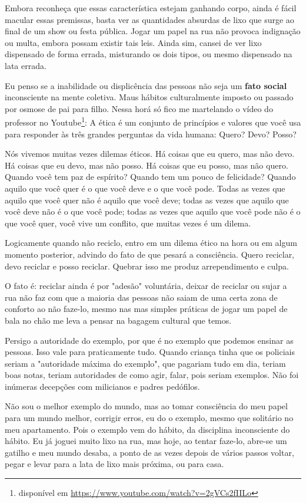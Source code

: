 Embora reconheça que essas característica estejam ganhando corpo, ainda é fácil macular essas premissas, basta ver as quantidades absurdas de lixo que surge ao final de um show ou festa pública. Jogar um papel na rua não provoca indignação ou multa, embora possam existir tais leis.
Ainda sim, cansei de ver lixo dispensado de forma errada, misturando os dois tipos, ou mesmo dispensado na lata errada.

Eu penso se a inabilidade ou displicência das pessoas não seja um \textbf{fato social} inconsciente na mente coletiva. Maus hábitos culturalmente imposto ou passado por osmose de pai para filho.
Nessa horá só fico me martelando o vídeo do professor  no Youtube\footnote{disponível em \url{https://www.youtube.com/watch?v=2gVCs2fIILo}}: A ética é um conjunto de princípios e valores que você usa para responder às três grandes perguntas da vida humana: Quero? Devo? Posso?

Nós vivemos muitas vezes dilemas éticos. Há coisas que eu quero, mas não devo. Há coisas que eu devo, mas não posso. Há coisas que eu posso, mas não quero. Quando você tem paz de espírito? Quando tem um pouco de felicidade? Quando aquilo que você quer é o que você deve e o que você pode. Todas as vezes que aquilo que você quer não é aquilo que você deve; todas as vezes que aquilo que você deve não é o que você pode; todas as vezes que aquilo que você pode não é o que você quer, você vive um conflito, que muitas vezes é um dilema.

Logicamente quando não reciclo, entro em um dilema ético na hora ou em algum momento posterior, advindo do fato de que pesará a consciência. Quero reciclar, devo reciclar e posso reciclar. Quebrar isso me produz arrependimento e culpa.

O fato é: reciclar ainda é por "adesão" voluntária, deixar de reciclar ou sujar a rua não faz com que a maioria das pessoas não saiam de uma certa zona de conforto ao não faze-lo, mesmo nas mas simples práticas de jogar um papel de bala no chão me leva a pensar na bagagem cultural que temos.

Persigo a autoridade do exemplo, por que é no exemplo que podemos ensinar as pessoas. Isso vale para praticamente tudo. Quando criança tinha que os policiais seriam a "autoridade máxima do exemplo", que pagariam tudo em dia, teriam boas notas, teriam autoridades de como agir, falar, pois seriam exemplos. Não foi inúmeras decepções com milicianos e padres pedófilos.

Não sou o melhor exemplo do mundo, mas ao tomar consciência do meu papel para um mundo melhor, corrigir erros, eu do o exemplo, mesmo que solitário no meu apartamento. Pois o exemplo vem do hábito, da disciplina inconsciente do hábito. Eu já joguei muito lixo na rua, mas hoje, ao tentar faze-lo, abre-se um gatilho e meu mundo desaba, a ponto de as vezes depois de vários passos voltar, pegar e levar para a lata de lixo mais próxima, ou para casa.

